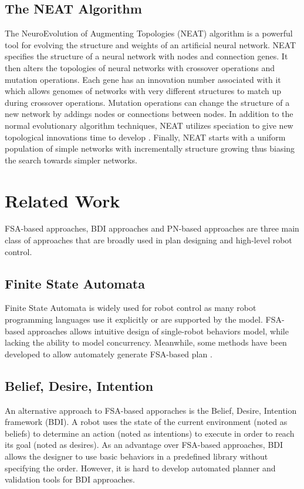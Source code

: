 \documentclass[12pt,a4paper,twocolumn]{article}
\begin{document}
\subsection{The NEAT Algorithm}

The NeuroEvolution of Augmenting Topologies (NEAT) algorithm is a powerful tool for evolving the structure and weights of an artificial neural network. NEAT specifies the structure of a neural network with nodes and connection genes. It then alters the topologies of neural networks with crossover operations and mutation operations. Each gene has an innovation number associated with it which allows genomes of networks with very different structures to match up during crossover operations. Mutation operations can change the structure of a new network by addings nodes or connections between nodes. In addition to the normal evolutionary algorithm techniques, NEAT utilizes speciation to give new topological innovations time to develop \cite{neat}. Finally, NEAT starts with a uniform population of simple networks with incrementally structure growing thus biasing the search towards simpler networks.

\section{Related Work}
FSA-based approaches, BDI approaches and PN-based approaches are three main class of approaches that are broadly used in plan designing and high-level robot control.

\subsection{Finite State Automata}

Finite State Automata is widely used for robot control as many robot programming languages use it explicitly or are supported by the model. FSA-based approaches allows intuitive design of single-robot behaviors model, while lacking the ability to model concurrency. Meanwhile, some methods have been developed to allow automately generate FSA-based plan \cite{kress2009temporal}.  

\subsection{Belief, Desire, Intention}

An alternative approach to FSA-based apporaches is the Belief, Desire, Intention framework (BDI). A robot uses the state of the current environment (noted as beliefs) to determine an action (noted as intentions) to execute in order to reach its goal (noted as desires). As an advantage over FSA-based approaches, BDI allows the designer to use basic behaviors in a predefined library without specifying the order. However, it is hard to develop automated planner and validation tools for BDI approaches.  
\end{document}
